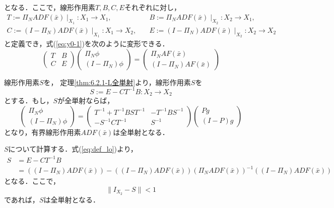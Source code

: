 となる．ここで，線形作用素$T,B,C,E$それぞれに対し，
\begin{equation*}
  \begin{split}
    T:= \Pi_N ADF(\bar{x}) \mid _{X_1}:X_1 \rightarrow X_1,\quad &
    B:= \Pi_N ADF(\bar{x}) \mid _{X_2}:X_2 \rightarrow X_1, \\
    C:= (I-\Pi_N) ADF(\bar{x}) \mid _{X_1}:X_1 \rightarrow X_2,\quad &
    E:= (I-\Pi_N) ADF(\bar{x}) \mid _{X_2}:X_2 \rightarrow X_2
    \label{eq:def_lo}
  \end{split}
\end{equation*}
と定義でき，式(\ref{eq:y0-1})を次のように変形できる．
\begin{equation}
  \begin{pmatrix}
    T & B \\
    C & E
  \end{pmatrix}
  \begin{pmatrix}
    \Pi_N \phi \\
    (I -\Pi_N) \phi
  \end{pmatrix}
  =
  \begin{pmatrix}
    \Pi_N A F(\bar{x}) \\
    (I - \Pi_N) A F(\bar{x})
  \end{pmatrix}
\end{equation}

線形作用素$S$を，
定理\ref{thm:6.2.1-L全単射}より，線形作用素$S$を
\begin{equation*}
  S:=E-CT^{-1}B:X_2 \rightarrow X_2
\end{equation*}
とする．もし，$S$が全単射ならば，
\begin{equation*}
  \begin{pmatrix}
    \Pi_N \phi \\
    (I-\Pi_N)\phi
  \end{pmatrix}
  =
  \begin{pmatrix}
    T^{-1}+T^{-1}BST^{-1} & -T^{-1}BS^{-1} \\
    -S^{-1}CT^{-1} & S^{-1}
  \end{pmatrix}
  \begin{pmatrix}
    Pg \\
    (I-P)g
  \end{pmatrix}
\end{equation*}
となり，有界線形作用素$ADF(\bar{x})$は全単射となる．

$S$について計算する．式(\ref{eq:def_lo})より，
\begin{equation}
  \begin{split}
    S &= E-CT^{-1}B \\
    &= \left( \left( I-\Pi_N \right) ADF ( \bar{x} ) \right) - (\left( I-\Pi_N \right) ADF( \bar{x} )) (\Pi_N ADF(\bar{x}))^{-1} ((I-\Pi_N)ADF(\bar{x}))
  \end{split}
  \label{eq:s-def}
\end{equation}
となる．ここで，
\begin{equation*}
  \| I_{X_2} -S \| < 1
\end{equation*}
であれば，$S$は全単射となる．


